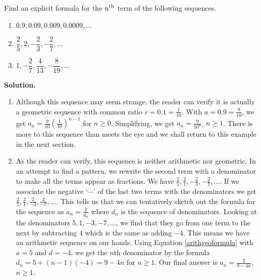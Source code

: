 \begin{ex}  \label{seqex2}  Find an explicit formula for the $n^{\mbox{\scriptsize th}}$ term of the following sequences.

\begin{multicols}{3}
\begin{enumerate}

\item  $0.9, 0.09, 0.009, 0.0009, \ldots$

\item  $\dfrac{2}{5}, 2, -\dfrac{2}{3}, -\dfrac{2}{7}, \ldots$

\item  $1, -\dfrac{2}{7}, \dfrac{4}{13}, -\dfrac{8}{19}, \ldots$

\end{enumerate}
\end{multicols}

{\bf Solution.}

\begin{enumerate}



\item  Although this sequence may seem strange, the reader can verify it is actually a geometric sequence with common ratio $r = 0.1 = \frac{1}{10}$. With $a = 0.9 = \frac{9}{10}$, we get $a_{n} = \frac{9}{10} \left(\frac{1}{10}\right)^{n-1}$ for $n \geq 0$.  Simplifying, we get $a_{n} = \frac{9}{10^{n}}$, $n \geq 1$.  There is more to this sequence than meets the eye and we shall return to this example in the next section.
 

\item As the reader can verify, this sequence is neither arithmetic nor geometric.  In an attempt to find a pattern, we rewrite the second term with a denominator to make all the terms appear as fractions.  We have $\frac{2}{5}, \frac{2}{1}, -\frac{2}{3}, -\frac{2}{7}, \ldots$. If we associate the negative `$-$' of the last two terms with the denominators we get $\frac{2}{5}, \frac{2}{1}, \frac{2}{-3}, \frac{2}{-7}, \ldots$.  This tells us that we can tentatively sketch out the formula for the sequence as $a_{n} = \frac{2}{d_{n}}$ where $d_{n}$ is the sequence of denominators.  Looking at the denominators  $5,1,-3,-7, \ldots$, we find that they go from one term to the next by subtracting $4$ which is the same as adding $-4$.  This means we have an arithmetic sequence on our hands.  Using Equation \ref{arithgeoformula} with $a = 5$ and $d = -4$, we get the $n$th denominator by the formula $d_{n} = 5 + (n-1)(-4) = 9-4n$ for $n \geq 1$.  Our final answer is $a_{n} = \frac{2}{9-4n}$, $n \geq 1$.



\end{enumerate}
\end{ex}

